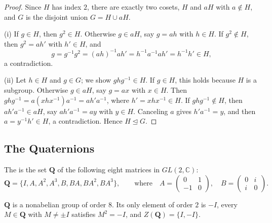 \begin{proof}
	Since \(H\) has index \(2\), there are exactly two cosets, \(H\) and \(aH\) with
	\(a \notin H\), and \(G\) is the disjoint union \(G = H \cup aH\).

	(i) If \(g \in H\), then \(g^2 \in H\). Otherwise \(g \in aH\), say \(g = ah\) with
	\(h \in H\). If \(g^2 \notin H\), then \(g^2 = ah'\) with \(h' \in H\), and
	\[
		g = g^{-1}g^2 = (ah)^{-1}ah' = h^{-1}a^{-1}ah' = h^{-1}h' \in H,
	\]
	a contradiction.

	(ii) Let \(h \in H\) and \(g \in G\); we show \(ghg^{-1} \in H\). If \(g \in H\), this
	holds because \(H\) is a subgroup. Otherwise \(g \in aH\), say \(g = ax\) with
	\(x \in H\). Then \(ghg^{-1} = a(xhx^{-1})a^{-1} = ah'a^{-1}\), where
	\(h' = xhx^{-1} \in H\). If \(ghg^{-1} \notin H\), then \(ah'a^{-1} \in aH\), say
	\(ah'a^{-1} = ay\) with \(y \in H\). Canceling \(a\) gives \(h'a^{-1} = y\), and then
	\(a = y^{-1}h' \in H\), a contradiction. Hence \(H \trianglelefteq G\).
\end{proof}

\subsection{The Quaternions}

\begin{definition}[Quaternions]\label{def:quaternions}
	The  is the set \(\mathbf Q\) of the following eight matrices
	in \(GL(2,\mathbb C)\):
	\[
		\mathbf Q = \{I, A, A^2, A^3, B, BA, BA^2, BA^3\},
		\qquad\text{where}\quad
		A = \begin{pmatrix} 0 & 1 \\ -1 & 0 \end{pmatrix},
		\quad
		B = \begin{pmatrix} 0 & i \\ i & 0 \end{pmatrix}.
	\]
\end{definition}

\begin{proposition}\label{prop:quaternions}
	\(\mathbf Q\) is a nonabelian group of order \(8\). Its only element of order \(2\) is
	\(-I\), every \(M \in \mathbf Q\) with \(M \neq \pm I\) satisfies \(M^2 = -I\), and
	\(Z(\mathbf Q) = \{I, -I\}\).
\end{proposition}

